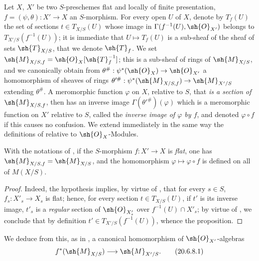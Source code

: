 \begin{env}[20.6.7]
\label{IV.20.6.7}
Let $X$, $X'$ be two $S$-preschemes flat and locally of finite presentation, $f=(\psi,\theta):X'\to X$ an $S$-morphism.
For every open $U$ of $X$, denote by $T_f(U)$ the set of sections $t\in T_{X/S}(U)$ whose image in $\Gamma(f^{-1}(U),\sh{O}_{X'})$ belongs to $T_{X'/S}(f^{-1}(U))$;
it is immediate that $U\mapsto T_f(U)$ is a sub-sheaf of the sheaf of sets $\sh{T}_{X/S}$, that we denote $\sh{T}_f$.
We set $\sh{M}_{X/S,f}=\sh{O}_X[\sh{T}_f^{-1}]$;
this is a sub-sheaf of rings of $\sh{M}_{X/S}$, and we canonically obtain from $\theta^\#:\psi^*(\sh{O}_X)\to\sh{O}_{X'}$ a homomorphism of sheaves of rings $\theta'^{\#}:\psi^*(\sh{M}_{X/S,f})\to\sh{M}_{X'/S}$ extending $\theta^\#$.
A meromorphic function $\varphi$ on $X$, relative to $S$, that \emph{is a section of $\sh{M}_{X/S,f}$}, then has an inverse image $\Gamma(\theta'^{\#})(\varphi)$ which is a meromorphic function on $X'$ relative to $S$, called the \emph{inverse image of $\varphi$ by $f$}, and denoted $\varphi\circ f$ if this causes no confusion.
We extend immediately in the same way the definitions of  relative to $\sh{O}_X$-Modules.
\end{env}

\begin{proposition}[20.6.8]
\label{IV.20.6.8}
With the notations of , if the $S$-morphism $f:X'\to X$ is \emph{flat}, one has $\sh{M}_{X/S,f}=\sh{M}_{X/S}$, and the homomorphism $\varphi\mapsto\varphi\circ f$ is defined on all of $M(X/S)$.
\end{proposition}

\begin{proof}
Indeed, the hypothesis implies, by virtue of , that for every $s\in S$, $f_s:X'_s\to X_s$ is flat;
hence, for every section $t\in T_{X/S}(U)$, if $t'$ is its inverse image, $t'_s$ is a \emph{regular} section of $\sh{O}_{X'_s}$ over $f^{-1}(U)\cap X'_s$;
by virtue of , we conclude that by definition $t'\in T_{X'/S}(f^{-1}(U))$, whence the proposition.
\end{proof}

We deduce from this, as in , a canonical homomorphism of $\sh{O}_{X'}$-algebras
\[
\label{IV.20.6.8.1}
  f^*(\sh{M}_{X/S})\longrightarrow\sh{M}_{X'/S}.
  \tag{20.6.8.1}
\]

